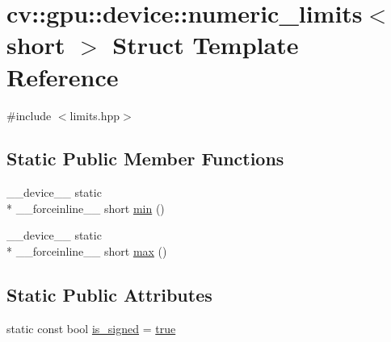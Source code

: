 \hypertarget{structcv_1_1gpu_1_1device_1_1numeric__limits_3_01short_01_4}{\section{cv\-:\-:gpu\-:\-:device\-:\-:numeric\-\_\-limits$<$ short $>$ Struct Template Reference}
\label{structcv_1_1gpu_1_1device_1_1numeric__limits_3_01short_01_4}
}


{\ttfamily \#include $<$limits.\-hpp$>$}

\subsection*{Static Public Member Functions}
\begin{DoxyCompactItemize}
\item 
\-\_\-\-\_\-device\-\_\-\-\_\- static \\*
\-\_\-\-\_\-forceinline\-\_\-\-\_\- short \hyperlink{structcv_1_1gpu_1_1device_1_1numeric__limits_3_01short_01_4_ae10e947c274497ddfd4fc7441b88027a}{min} ()
\item 
\-\_\-\-\_\-device\-\_\-\-\_\- static \\*
\-\_\-\-\_\-forceinline\-\_\-\-\_\- short \hyperlink{structcv_1_1gpu_1_1device_1_1numeric__limits_3_01short_01_4_ad48b0b9379bb2fe527ee92a7016bf8e5}{max} ()
\end{DoxyCompactItemize}
\subsection*{Static Public Attributes}
\begin{DoxyCompactItemize}
\item 
static const bool \hyperlink{structcv_1_1gpu_1_1device_1_1numeric__limits_3_01short_01_4_a694bef16b8e6ac3cd83c330387aedbe2}{is\-\_\-signed} = \hyperlink{namespacecv_1_1gpu_1_1device_ac34c172a7a1904fb0fd477321a31f926}{true}
\end{DoxyCompactItemize}


